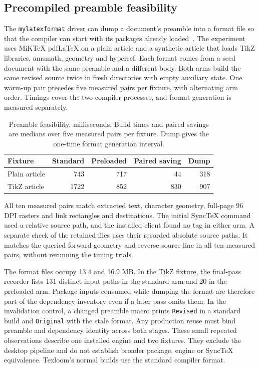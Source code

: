\subsection{Precompiled preamble feasibility}

The \texttt{mylatexformat} driver can dump a document's preamble into a format
file so that the compiler can start with its packages already loaded~\cite{mylatexformat}.
The experiment uses MiKTeX pdf\LaTeX{} on a plain article and a synthetic
article that loads TikZ libraries, amsmath, geometry and hyperref. Each format
comes from a seed document with the same preamble and a different body. Both
arms build the same revised source twice in fresh directories with empty
auxiliary state. One warm-up pair precedes five measured pairs per fixture,
with alternating arm order. Timings cover the two compiler processes, and
format generation is measured separately.

\begin{table}[htbp]
\small\centering
\begin{tabular}{@{}lrrrr@{}}
\toprule
Fixture & Standard & Preloaded & Paired saving & Dump\\
\midrule
Plain article & 743 & 717 & 44 & 318\\
TikZ article & 1722 & 852 & 830 & 907\\
\bottomrule
\end{tabular}
\caption{Preamble feasibility, milliseconds. Build times and paired savings
are medians over five measured pairs per fixture. Dump gives the one-time
format generation interval.}
\label{tab:preamble-feasibility}
\end{table}

All ten measured pairs match extracted text, character geometry, full-page
96 DPI rasters and link rectangles and destinations. The initial SyncTeX
command used a relative source path, and the installed client found no tag
in either arm. A separate check of the retained files uses their recorded
absolute source paths. It matches the queried forward geometry and reverse
source line in all ten measured pairs, without rerunning the timing trials.

The format files occupy 13.4 and 16.9 MB. In the TikZ fixture, the final-pass
recorder lists 131 distinct input paths in the standard arm and 20 in the
preloaded arm. Package inputs consumed while dumping the format are therefore
part of the dependency inventory even if a later pass omits them. In the
invalidation control, a changed preamble macro prints \texttt{Revised} in a
standard build and \texttt{Original} with the stale format. Any production
reuse must bind preamble and dependency identity across both stages. These
small repeated observations describe one installed engine and two fixtures.
They exclude the desktop pipeline and do not establish broader package,
engine or SyncTeX equivalence. Texloom's normal builds use the standard
compiler format.

